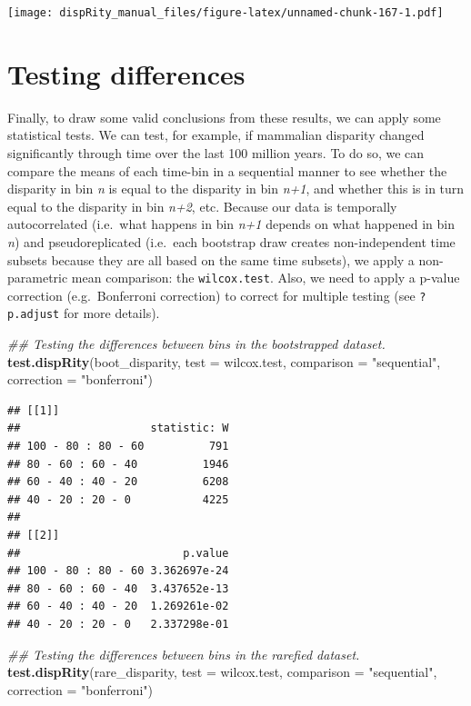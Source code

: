 \documentclass[]{book}
\newenvironment{Shaded}{\begin{snugshade}}{\end{snugshade}}
\newcommand{\CommentTok}[1]{\textcolor[rgb]{0.56,0.35,0.01}{\textit{#1}}}
\newcommand{\DataTypeTok}[1]{\textcolor[rgb]{0.13,0.29,0.53}{#1}}
\newcommand{\KeywordTok}[1]{\textcolor[rgb]{0.13,0.29,0.53}{\textbf{#1}}}
\newcommand{\NormalTok}[1]{#1}
\newcommand{\StringTok}[1]{\textcolor[rgb]{0.31,0.60,0.02}{#1}}
\begin{document}
\texttt{[image: dispRity\_manual\_files/figure-latex/unnamed-chunk-167-1.pdf]}

\hypertarget{testing-differences}{%
\section{Testing differences}\label{testing-differences}}

Finally, to draw some valid conclusions from these results, we can apply some statistical tests.
We can test, for example, if mammalian disparity changed significantly through time over the last 100 million years.
To do so, we can compare the means of each time-bin in a sequential manner to see whether the disparity in bin \emph{n} is equal to the disparity in bin \emph{n+1}, and whether this is in turn equal to the disparity in bin \emph{n+2}, etc.
Because our data is temporally autocorrelated (i.e.~what happens in bin \emph{n+1} depends on what happened in bin \emph{n}) and pseudoreplicated (i.e.~each bootstrap draw creates non-independent time subsets because they are all based on the same time subsets), we apply a non-parametric mean comparison: the \texttt{wilcox.test}.
Also, we need to apply a p-value correction (e.g.~Bonferroni correction) to correct for multiple testing (see \texttt{?p.adjust} for more details).

\begin{Shaded}
\begin{Highlighting}[]
\CommentTok{## Testing the differences between bins in the bootstrapped dataset.}
\KeywordTok{test.dispRity}\NormalTok{(boot_disparity, }\DataTypeTok{test =}\NormalTok{ wilcox.test, }\DataTypeTok{comparison =} \StringTok{"sequential"}\NormalTok{,}
    \DataTypeTok{correction =} \StringTok{"bonferroni"}\NormalTok{)}
\end{Highlighting}
\end{Shaded}

\begin{verbatim}
## [[1]]
##                    statistic: W
## 100 - 80 : 80 - 60          791
## 80 - 60 : 60 - 40          1946
## 60 - 40 : 40 - 20          6208
## 40 - 20 : 20 - 0           4225
## 
## [[2]]
##                         p.value
## 100 - 80 : 80 - 60 3.362697e-24
## 80 - 60 : 60 - 40  3.437652e-13
## 60 - 40 : 40 - 20  1.269261e-02
## 40 - 20 : 20 - 0   2.337298e-01
\end{verbatim}

\begin{Shaded}
\begin{Highlighting}[]
\CommentTok{## Testing the differences between bins in the rarefied dataset.}
\KeywordTok{test.dispRity}\NormalTok{(rare_disparity, }\DataTypeTok{test =}\NormalTok{ wilcox.test, }\DataTypeTok{comparison =} \StringTok{"sequential"}\NormalTok{,}
    \DataTypeTok{correction =} \StringTok{"bonferroni"}\NormalTok{)}
\end{Highlighting}
\end{Shaded}
\end{document}
